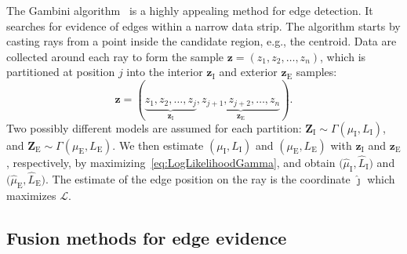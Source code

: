 \documentclass{article}
\begin{document}
The Gambini algorithm~\cite{Gambini2007} is a highly appealing method for edge detection. 
It searches for evidence of edges within a narrow data strip. 
The algorithm starts by casting rays from a point inside the candidate region, e.g., the centroid.
Data are collected around each ray to form the sample $\bm z = (z_1,z_2,\dots,z_n)$, which is partitioned at position $j$ into the interior $\bm z_\text{I}$ and exterior $\bm z_\text{E}$ samples:
\vspace{-0.2cm}
$$
\bm z = (\underbrace{z_1,z_2,\dots,z_j}_{\bm z_\text{I}}, 
\underbrace{z_{j+1}, z_{j+2},\dots,z_n}_{\bm z_\text{E}}).
$$
Two possibly different models are assumed for each partition:
$\bm Z_\text{I} \sim \Gamma(\mu_\text{I},L_\text{I})$, and 
$\bm Z_\text{E} \sim \Gamma(\mu_\text{E},L_\text{E})$.
We then estimate $(\mu_\text{I},L_\text{I})$ and $(\mu_\text{E},L_\text{E})$ with $\bm z_\text{I}$ and $\bm z_\text{E}$, respectively, by maximizing~\eqref{eq:LogLikelihoodGamma}, and obtain $\big(\widehat{\mu}_\text{I}, \widehat{L}_\text{I}\big)$ and $\big(\widehat{\mu}_\text{E}, \widehat{L}_\text{E}\big)$.
The estimate of the edge position on the ray is the coordinate  $\widehat\jmath$ which maximizes $\mathcal L$.
\vspace{-0.2cm}
\subsection{Fusion methods for edge evidence}%
\end{document}
